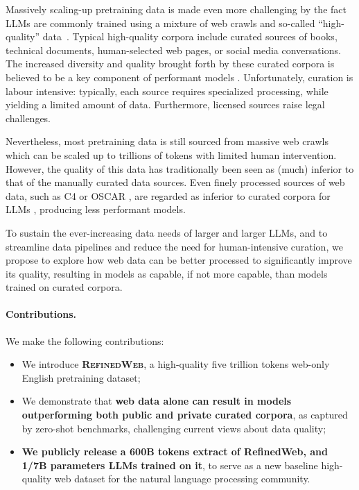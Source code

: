 Massively scaling-up pretraining data is made even more challenging by the fact LLMs are commonly trained using a mixture of web crawls and so-called ``high-quality'' data~\cite{brown2020language, gao2020pile}. Typical high-quality corpora include curated sources of books, technical documents, human-selected web pages, or social media conversations. The increased diversity and quality brought forth by these curated corpora is believed to be a key component of performant models \cite{scao2022language}. Unfortunately, curation is labour intensive: typically, each source requires specialized processing, while yielding a limited amount of data. Furthermore, licensed sources raise legal challenges.

Nevertheless, most pretraining data is still sourced from massive web crawls which can be scaled up to trillions of tokens with limited human intervention. However, the quality of this data has traditionally been seen as (much) inferior to that of the manually curated data sources. Even finely processed sources of web data, such as C4 \cite{2020t5} or OSCAR \cite{OrtizSuarezSagotRomary2019}, are regarded as inferior to curated corpora for LLMs \cite{gopher, scao2022language}, producing less performant models.

To sustain the ever-increasing data needs of larger and larger LLMs, and to streamline data pipelines and reduce the need for human-intensive curation, we propose to explore how web data can be better processed to significantly improve its quality, resulting in models as capable, if not more capable, than models trained on curated corpora. 

\paragraph{Contributions.} We make the following contributions:

\begin{itemize}
    \item We introduce \textcolor{refinedweb}{\textbf{\textsc{RefinedWeb}}}, a high-quality five trillion tokens web-only English pretraining dataset;
    \item We demonstrate that \textbf{web data alone can result in models outperforming both public and private curated corpora}, as captured by zero-shot benchmarks, challenging current views about data quality;
    \item \textbf{We publicly release a 600B tokens extract of RefinedWeb, and 1/7B parameters LLMs trained on it}, to serve as a new baseline high-quality web dataset for the natural language processing community.
\end{itemize}

